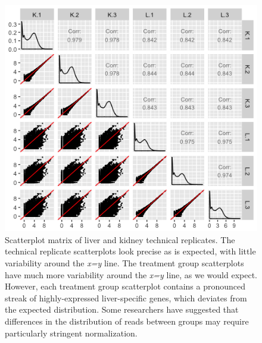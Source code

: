 \documentclass{bioinfo}
\begin{document}
\begin{figure}[!tpb]
\centerline{\includegraphics[width=1\columnwidth]{../MakeFigures/lkSM.jpg}}
\caption{Scatterplot matrix of liver and kidney technical replicates. The technical replicate scatterplots look precise as is expected, with little variability around the \textit{x=y} line. The treatment group scatterplots have much more variability around the \textit{x=y} line, as we would expect. However, each treatment group scatterplot contains a pronounced streak of highly-expressed liver-specific genes, which deviates from the expected distribution. Some researchers have suggested that differences in the distribution of reads between groups may require particularly stringent normalization.
\label{lkSM}}
\end{figure}
\end{document}
